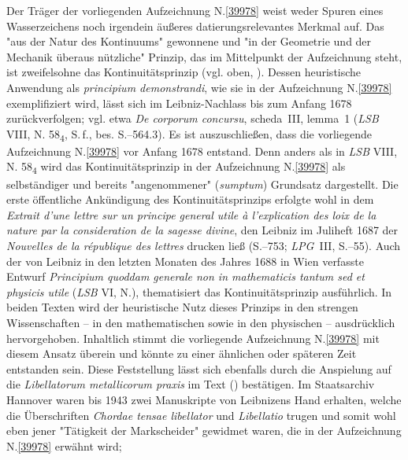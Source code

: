 %
Der Träger der vorliegenden Aufzeichnung N.\;\ref{39978} weist weder Spuren eines Wasserzeichens noch irgendein äußeres datierungsrelevantes Merkmal auf.
Das "aus der Natur des Kontinuums" gewonnene und "in der Geometrie und der Mechanik überaus nützliche" Prinzip, das im Mittelpunkt der Aufzeichnung steht, ist zweifelsohne das Kontinuitätsprinzip (vgl. oben, ).
Dessen heuristische Anwendung als \textit{principium demonstrandi}, wie sie in der Aufzeichnung N.\;\ref{39978} exemplifiziert wird, lässt sich im Leibniz-Nachlass bis zum Anfang 1678 zurückverfolgen;
vgl. etwa \textit{De corporum concursu}, scheda~III, lemma~1 (\textit{LSB} VIII, N. 58\textsubscript{4}, S.\,f., bes. S.--564.3).\cite{01401}
Es ist auszuschließen, dass die vorliegende Aufzeichnung N.\;\ref{39978} vor Anfang 1678 entstand.
Denn anders als in \textit{LSB} VIII, N. 58\textsubscript{4}\cite{01401} wird das Kontinuitätsprinzip in der Aufzeichnung N.\;\ref{39978} als selbständiger und bereits "angenommener" (\textit{sumptum}) Grundsatz dargestellt.
\pend%
\pstart%
Die erste öffentliche Ankündigung des Kontinuitätsprinzips erfolgte wohl in dem \textit{Extrait d’une lettre sur un principe general utile à l'explication des loix de la nature par la consideration de la sagesse divine}, den Leibniz im Juliheft 1687 der \textit{Nouvelles de la république des lettres} drucken ließ (S.–753; \textit{LPG}~III, S.–55).\cite{02054}
Auch der von Leibniz in den letzten Monaten des Jahres 1688 in Wien verfasste Entwurf \textit{Principium quoddam generale non in mathematicis tantum sed et physicis utile} (\textit{LSB} VI, N.),\cite{02055} thematisiert das Kontinuitätsprinzip ausführlich.
In beiden Texten wird der heuristische Nutz dieses Prinzips in den strengen Wissenschaften -- in den mathematischen sowie in den physischen -- ausdrücklich hervorgehoben.
Inhaltlich stimmt die vorliegende Aufzeichnung N.\;\ref{39978} mit diesem Ansatz überein und könnte zu einer ähnlichen oder späteren Zeit entstanden sein.
\pend%
\pstart%
Diese Feststellung lässt sich ebenfalls durch die Anspielung auf die \textit{Libellatorum metallicorum praxis} im Text () bestätigen.
Im Staatsarchiv Hannover waren bis 1943 zwei Manuskripte von Leibnizens Hand erhalten, welche die Überschriften \textit{Chordae tensae libellator} und \textit{Libellatio} trugen und somit wohl eben jener "Tätigkeit der Markscheider" gewidmet waren, die in der Aufzeichnung N.\;\ref{39978} erwähnt wird;
